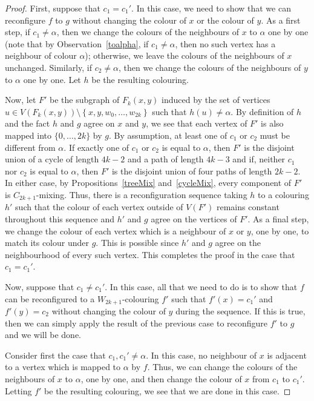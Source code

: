 \documentclass[11 pt]{amsart}
\theoremstyle{definition}
\theoremstyle{case}
\numberwithin{equation}{section}
\begin{document}
\begin{proof}
First, suppose that $c_1=c_1'$. In this case, we need to show that we can reconfigure $f$ to $g$ without changing the colour of $x$ or the colour of $y$. As a first step, if $c_1\neq \alpha$, then we change the colours of the neighbours of $x$ to $\alpha$ one by one (note that by Observation~\ref{toalpha}, if $c_1\neq \alpha$, then no such vertex has a neighbour of colour $\alpha$); otherwise, we leave the colours of the neighbours of $x$ unchanged.  Similarly, if $c_2\neq \alpha$, then we change the colours of the neighbours of $y$ to $\alpha$ one by one. Let $h$ be the resulting colouring.

Now, let $F'$ be the subgraph of $F_k(x,y)$ induced by the set of vertices $u\in V(F_k(x,y))\setminus\left\{x,y,w_0,\dots,w_{2k}\right\}$ such that $h(u)\neq\alpha$. By definition of $h$ and the fact $h$ and $g$ agree on $x$ and $y$, we see that each vertex of $F'$ is also mapped into $\{0,\dots,2k\}$ by $g$. By assumption, at least one of $c_1$ or $c_2$ must be different from $\alpha$. If exactly one of $c_1$ or $c_2$ is equal to $\alpha$, then $F'$ is the disjoint union of a cycle of length $4k-2$ and a path of length $4k-3$ and if, neither $c_1$ nor $c_2$ is equal to $\alpha$, then $F'$ is the disjoint union of four paths of length $2k-2$. In either case, by Propositions~\ref{treeMix} and~\ref{cycleMix}, every component of $F'$ is $C_{2k+1}$-mixing. Thus, there is a reconfiguration sequence taking $h$ to a colouring $h'$ such that the colour of each vertex outside of $V(F')$ remains constant throughout this sequence and $h'$ and $g$ agree on the vertices of $F'$. As a final step, we change the colour of each vertex which is a neighbour of $x$ or $y$, one by one, to match its colour under $g$. This is possible since $h'$ and $g$ agree on the neighbourhood of every such vertex. This completes the proof in the case that $c_1=c_1'$. 

Now, suppose that $c_1\neq c_1'$. In this case, all that we need to do is to show that $f$ can be reconfigured to a $W_{2k+1}$-colouring $f'$ such that $f'(x)=c_1'$ and $f'(y)=c_2$ without changing the colour of $y$ during the sequence. If this is true, then we can simply apply the result of the previous case to reconfigure $f'$ to $g$ and we will be done. 

Consider first the case that $c_1,c_1'\neq \alpha$. In this case, no neighbour of $x$ is adjacent to a vertex which is mapped to $\alpha$ by $f$. Thus, we can change the colours of the neighbours of $x$ to $\alpha$, one by one, and then change the colour of $x$ from $c_1$ to $c_1'$. Letting $f'$ be the resulting colouring, we see that we are done in this case. 


\end{proof}
\end{document}

